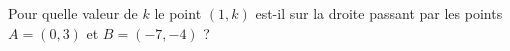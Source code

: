 
\begin{exercice}\label{exosmath-0236}

    Pour quelle valeur de \( k\) le point \( (1,k)\) est-il sur la droite passant par les points \( A=(0,3)\) et \( B=(-7,-4)\) ?

\end{exercice}
